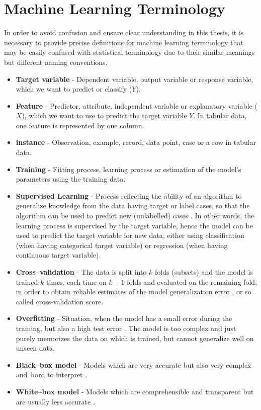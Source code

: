 \section{Machine Learning Terminology}
\label{sec:mlterms}
In order to avoid confusion and ensure clear understanding in this thesis, it is necessary to provide precise definitions for machine learning terminology that may be easily confused with statistical terminology due to their similar meanings but different naming conventions.
\begin{itemize}\setlength\itemsep{0em}
	\item \textbf{Target variable} - Dependent variable, output variable or response variable, which we want to predict or classify ($Y$).
	\item \textbf{Feature} - Predictor, attribute, independent variable or explanatory variable ($X$), which we want to use to predict the target variable $Y$. In tabular data, one feature is represented by one column.
	\item \textbf{instance} - Observation, example, record, data point, case or a row in tabular data.
	\item \textbf{Training} - Fitting process, learning process or estimation of the model's parameters using the training data.
	\item \textbf{Supervised Learning} - Process reflecting the ability of an algorithm to generalize knowledge from the data having target or label cases, so that the algorithm can be used to predict new (unlabelled) cases \citep{berry2020supervised}.
    In other words, the learning process is supervised by the target variable, hence the model can be used to predict the target variable for new data, either using classification (when having categorical target variable) or regression (when having continuous target variable).
	\item \textbf{Cross--validation} - The data is split into $k$ folds (subsets) and the model is trained $k$ times, each time on $k-1$ folds and evaluated on the remaining fold, in order to obtain reliable estimates of the model generalization error \citep{tatsat2020machine}, or so called cross-validation score.
	\item \textbf{Overfitting} - Situation, when the model has a small error during the training, but also a high test error \citep{forsyth2019applied}. The model is too complex and just purely memorizes the data on which is trained, but cannot generalize well on unseen data.
	\item \textbf{Black--box model} - Models which are very accurate but also very complex and hard to interpret \citep{pintelas2020grey}.
	\item \textbf{White--box model} -  Models which are comprehensible and transparent but are usually less accurate  \citep{pintelas2020grey}.
\end{itemize}
\newpage

